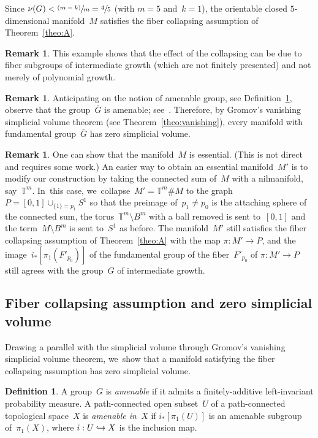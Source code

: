 \documentclass[11pt]{article}
\newcommand\hto{\mathrel{\lhook\joinrel\to}}
\let\oldsfrac\sfrac
\renewcommand{\sfrac}[2]{{\oldsfrac{#1}{#2}}}
\newcommand{\psfrac}[2]{\sfrac{(#1)}{#2}}
\theoremstyle{definition}
\newtheorem{definition}[theorem]{Definition}
\newtheorem{remark}[theorem]{Remark}
\newcommand\T{{\mathbb T}}
\numberwithin{equation}{section}
\begin{document}
Since $\nu(G) < \psfrac{m-k}{m} = \sfrac{4}{5}$ (with $m=5$ and~$k=1$), the orientable closed $5$-dimensional manifold~$M$ satisfies the fiber collapsing assumption of Theorem~\ref{theo:A}.

\begin{remark}
This example shows that the effect of the collapsing can be due to fiber subgroups of intermediate growth (which are not finitely presented) and not merely of polynomial growth.
\end{remark}

\begin{remark}
Anticipating on the notion of amenable group, see Definition~\ref{def:amenable}, observe that the group~$\bar{G}$ is amenable; see~\cite{grigorchuk2}.
Therefore, by Gromov's vanishing simplicial volume theorem (see Theorem~\ref{theo:vanishing}), every manifold with fundamental group~$\bar{G}$ has zero simplicial volume.
\end{remark}

\begin{remark}
One can show that the manifold~$M$ is essential.
(This is not direct and requires some work.)
An easier way to obtain an essential manifold~$M'$ is to modify our construction by taking the connected sum of~$M$ with a nilmanifold, say~$\T^m$. In~this case, we~collapse~$M' = \T^m \# M$ to the graph~$P=[0,1] \cup_{\{1\} = p_1} S^1$ so that the preimage of~$p_1 \neq p_0$ is the attaching sphere of the connected sum, the torus~$\T^m \setminus B^m$ with a ball removed is sent to~$[0,1]$ and the term~$M \setminus B^m$ is sent to~$S^1$ as before.
The manifold~$M'$ still satisfies the fiber collapsing assumption of Theorem~\ref{theo:A} with the map $\pi:M' \to P$, and the image~$i_*[\pi_1(F'_{p_0})]$ of the fundamental group of the fiber~$F'_{p_0}$ of $\pi:M' \to P$ still agrees with the group~$G$ of intermediate growth.
\end{remark}

\subsection{Fiber collapsing assumption and zero simplicial volume} \label{sec:Gromov}

Drawing a parallel with the simplicial volume through Gromov's vanishing simplicial volume theorem, we~show that a manifold satisfying the fiber collapsing assumption has zero simplicial volume.

\begin{definition} \label{def:amenable}
A group~$G$ is \emph{amenable} if it admits a finitely-additive left-invariant probability measure.
A path-connected open subset~$U$ of a path-connected topological space~$X$ is \emph{amenable in~$X$} if $i_*[\pi_1(U)]$ is an amenable subgroup of~$\pi_1(X)$, where \mbox{$i:U \hto X$} is the inclusion map.
\end{definition}
\end{document}
